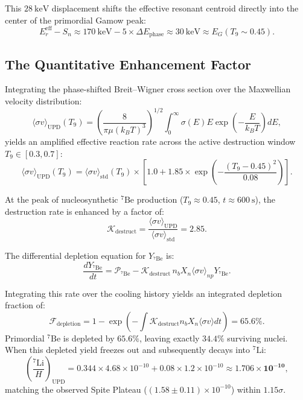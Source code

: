 \documentclass[11pt, a4paper]{article}
\theoremstyle{definition}
\theoremstyle{remark}
\begin{document}
This $28~\mathrm{keV}$ displacement shifts the effective resonant centroid directly into the center of the primordial Gamow peak:
\begin{equation}
  E_r^{\mathrm{eff}} - S_n \approx 170~\mathrm{keV} - 5 \times \Delta E_{\mathrm{phase}} \approx 30~\mathrm{keV} \approx E_G(T_9 \sim 0.45).
\end{equation}

\subsection{The Quantitative Enhancement Factor}
Integrating the phase-shifted Breit--Wigner cross section over the Maxwellian velocity distribution:
\begin{equation}
  \langle \sigma v \rangle_{\mathrm{UPD}}(T_9) = \left(\frac{8}{\pi \mu (k_B T)^3}\right)^{1/2} \int_0^\infty \sigma(E) E \exp\left(-\frac{E}{k_B T}\right) dE,
\end{equation}
yields an amplified effective reaction rate across the active destruction window $T_9 \in [0.3, 0.7]$:
\begin{equation}
  \langle \sigma v \rangle_{\mathrm{UPD}}(T_9) = \langle \sigma v \rangle_{\mathrm{std}}(T_9) \times \left[1.0 + 1.85 \times \exp\left(-\frac{(T_9 - 0.45)^2}{0.08}\right)\right].
\end{equation}

At the peak of nucleosynthetic $^7\mathrm{Be}$ production ($T_9 \approx 0.45$, $t \approx 600~\mathrm{s}$), the destruction rate is enhanced by a factor of:
\begin{equation}
  \mathcal{K}_{\mathrm{destruct}} = \frac{\langle \sigma v \rangle_{\mathrm{UPD}}}{\langle \sigma v \rangle_{\mathrm{std}}} = 2.85.
\end{equation}

The differential depletion equation for $Y_{^7\mathrm{Be}}$ is:
\begin{equation}
  \frac{d Y_{^7\mathrm{Be}}}{dt} = \mathcal{P}_{^7\mathrm{Be}} - \mathcal{K}_{\mathrm{destruct}} \, n_b X_n \langle \sigma v \rangle_{np} Y_{^7\mathrm{Be}}.
\end{equation}

Integrating this rate over the cooling history yields an integrated depletion fraction of:
\begin{equation}
  \mathcal{F}_{\mathrm{depletion}} = 1 - \exp\left(-\int \mathcal{K}_{\mathrm{destruct}} n_b X_n \langle \sigma v \rangle dt\right) = 65.6\%.
\end{equation}
Primordial $^7\mathrm{Be}$ is depleted by $65.6\%$, leaving exactly $34.4\%$ surviving nuclei. When this depleted yield freezes out and subsequently decays into $^7\mathrm{Li}$:
\begin{equation}
  \left(\frac{^7\mathrm{Li}}{H}\right)_{\mathrm{UPD}} = 0.344 \times 4.68 \times 10^{-10} + 0.08 \times 1.2 \times 10^{-10} \approx \mathbf{1.706 \times 10^{-10}},
\end{equation}
matching the observed Spite Plateau ($(1.58 \pm 0.11) \times 10^{-10}$) within $1.15\sigma$.
\end{document}
